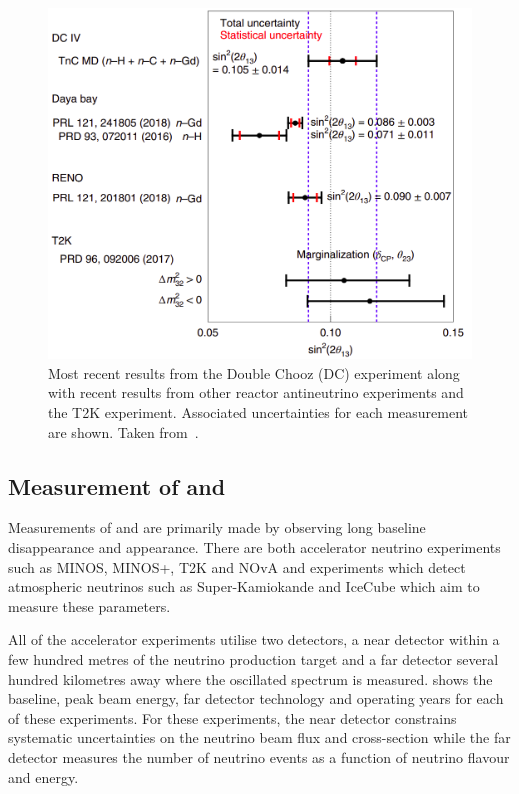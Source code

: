 \begin{figure}[h]
  \centering
  \includegraphics[width=.7\linewidth]{files/figures/theory/theta13Measurements}
  \caption[Results from the Double Chooz experiment along with recent results from other reactor antineutrino experiments and the T2K experiment.]{Most recent results from the Double Chooz (DC) experiment along with recent results from other reactor antineutrino experiments and the T2K experiment. Associated uncertainties for each measurement are shown. Taken from~\cite{dcIV}.}
  \label{fig:theta13Measurements}
\end{figure}

\subsection{Measurement of  and }
\label{sec:theory:currentState:lbl}

Measurements of  and  are primarily made by observing long baseline \numu disappearance and \nue appearance.
There are both accelerator neutrino experiments such as MINOS, MINOS+, T2K and NOvA and experiments which detect atmospheric neutrinos such as Super-Kamiokande and IceCube which aim to measure these parameters.

All of the accelerator experiments utilise two detectors, a near detector within a few hundred metres of the neutrino production target and a far detector several hundred kilometres away where the oscillated spectrum is measured.
 shows the baseline, peak beam energy, far detector technology and operating years for each of these experiments.
For these experiments, the near detector constrains systematic uncertainties on the neutrino beam flux and cross-section while the far detector measures the number of neutrino events as a function of neutrino flavour and energy.


